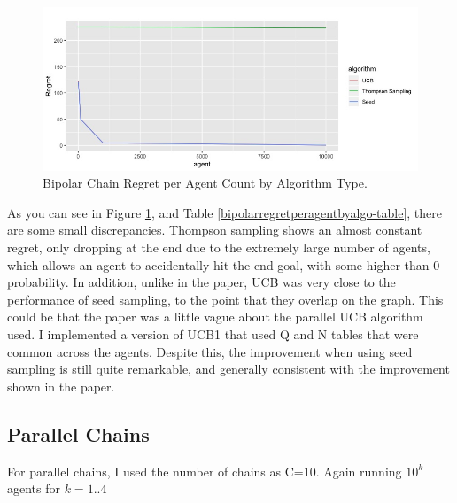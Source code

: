\documentclass{article}
\begin{document}
\begin{figure}[htbp!]
  \centering
\includegraphics[scale=.3]{results_pre.jpeg}

  \caption{Bipolar Chain Regret per Agent Count by Algorithm Type.}
 \label{fig:bipolarregretperagentbyalgo}
\end{figure}
As you can see in Figure \ref{fig:bipolarregretperagentbyalgo}, and Table \ref{bipolarregretperagentbyalgo-table}, there are some small discrepancies. Thompson sampling shows an almost constant regret, only dropping at the end due to the extremely large number of agents,  which allows an agent to accidentally hit the end goal, with some higher than 0 probability. In addition, unlike in the paper, UCB was very close to the performance of seed sampling, to the point that they overlap on the graph. This could be that the paper was a little vague about the parallel UCB algorithm used. I implemented a version of UCB1 that used Q and N tables that were common across the agents. Despite this, the improvement when using seed sampling is still quite remarkable, and generally consistent with the improvement shown in the paper.


\subsection{Parallel Chains}
For parallel chains, I used the number of chains as C=10. Again running $10^k$ agents for $k=1..4$
\end{document}
